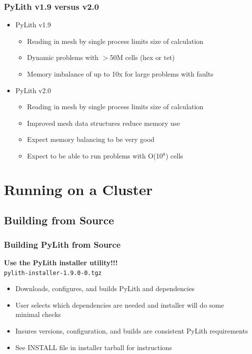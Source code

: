 \documentclass{beamer}
\newcommand{\important}[1]{{\color{red}#1}}
\begin{document}
\begin{frame}
  \frametitle{PyLith v1.9 versus v2.0}

  \begin{itemize}
  \item PyLith v1.9
    \begin{itemize}
    \item Reading in mesh by single process limits size of calculation
    \item Dynamic problems with $>$50M cells (hex or tet)
    \item Memory imbalance of up to 10x for large problems with faults
    \end{itemize}
  \item PyLith v2.0
    \begin{itemize}
    \item Reading in mesh by single process limits size of calculation
    \item Improved mesh data structures reduce memory use
    \item Expect memory balancing to be very good
    \item Expect to be able to run problems with O(10$^8$) cells
    \end{itemize}
  \end{itemize}

\end{frame}

\section{Running on a Cluster}
\subsection{Building from Source}

\begin{frame}
  \frametitle{Building PyLith from Source}

  \begin{center}
    {\bf\important{Use the PyLith installer utility!!!}} \\
    {\tt pylith-installer-1.9.0-0.tgz}
  \end{center}

  \begin{itemize}
  \item Downloads, configures, and builds PyLith and dependencies
  \item User selects which dependencies are needed and installer will
    do some minimal checks
  \item Insures versions, configuration, and builds are consistent
    PyLith requirements
  \item See INSTALL file in installer tarball for instructions
  \end{itemize}

\end{frame}
\end{document}
